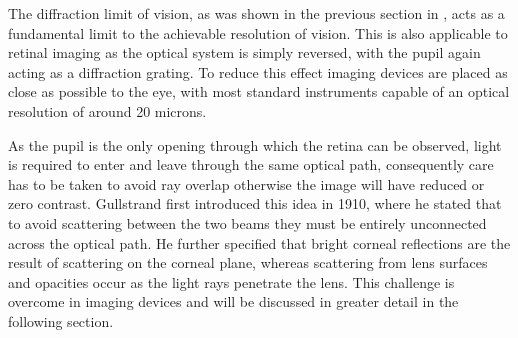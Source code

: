 The diffraction limit of vision, as was shown in the previous section in
, acts as a fundamental limit to the achievable resolution
of vision. This is also applicable to retinal imaging as the optical system is
simply reversed, with  the pupil again acting as a diffraction grating. To reduce
this effect imaging devices are placed as close as possible to the eye, with most
standard instruments capable of an optical resolution of around 20 microns.

As the pupil is the only opening through which the retina can be
observed, light is required to enter and leave through the same
optical path, consequently care has to be taken to avoid ray overlap
otherwise the image will have reduced or zero contrast. Gullstrand
first introduced this idea in 1910, where he stated that to avoid
scattering between the two beams they must be entirely unconnected
across the optical path.\cite{gullstrandcamera} He further specified that
bright corneal reflections are the result of scattering on the corneal plane,
whereas scattering from lens surfaces and opacities occur as the
light rays penetrate the lens. This challenge is overcome in
imaging devices and will be discussed in greater detail in the
following section.

